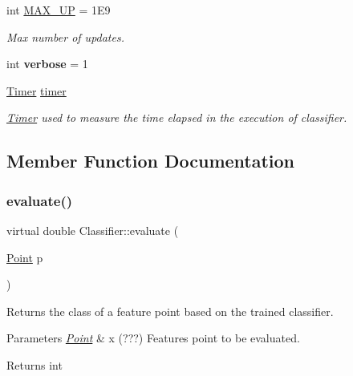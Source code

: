 \begin{DoxyCompactItemize}
\mbox{\label{class_classifier_abb8b95854801151e78a1d9f6a2173c22}} 
int \hyperlink{class_classifier_abb8b95854801151e78a1d9f6a2173c22}{M\+A\+X\+\_\+\+UP} = 1\+E9
\begin{DoxyCompactList}\small\item\em Max number of updates. \end{DoxyCompactList}\item 
\mbox{\label{class_classifier_a2b24f7f87ca8171ce07c888583646263}} 
int {\bfseries verbose} = 1
\item 
\mbox{\label{class_classifier_ae9d28253495ae8807d586faff951d46f}} 
\hyperlink{class_timer}{Timer} \hyperlink{class_classifier_ae9d28253495ae8807d586faff951d46f}{timer}
\begin{DoxyCompactList}\small\item\em \hyperlink{class_timer}{Timer} used to measure the time elapsed in the execution of classifier. \end{DoxyCompactList}\end{DoxyCompactItemize}


\subsection{Member Function Documentation}
\mbox{\label{class_classifier_ae8e9554823b85ddc2dcad2955da811d9}} 
\subsubsection{\texorpdfstring{evaluate()}{evaluate()}}
{\footnotesize\ttfamily virtual double Classifier\+::evaluate (\begin{DoxyParamCaption}\item[{\hyperlink{class_point}{Point}}]{p }\end{DoxyParamCaption})\hspace{0.3cm}{\ttfamily [pure virtual]}}



Returns the class of a feature point based on the trained classifier. 


\begin{DoxyParams}{Parameters}
{\em \hyperlink{class_point}{Point}} & x (???) Features point to be evaluated. \\
\hline
\end{DoxyParams}
\begin{DoxyReturn}{Returns}
int 
\end{DoxyReturn}


